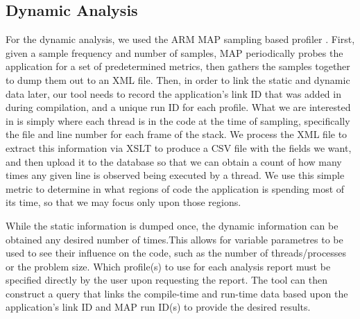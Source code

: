 \subsection{Dynamic Analysis}
\label{sec:dynamic}
For the dynamic analysis, we used the ARM MAP sampling based profiler \cite{arm-docs}.
First, given a sample frequency and number of samples, MAP periodically probes the application for 
a set of predetermined metrics, then gathers the samples together to dump them out to an \acs{XML} 
file. Then, in order to link the static and dynamic data later, our tool needs to record the application's 
link ID that was added in during compilation, and a unique run ID for each profile.
What we are interested in is simply where each thread is in the code at the time of sampling, 
specifically the file and line number for each frame of the stack.
We process the \acs{XML} file to extract this information via \ac{XSLT} to produce a \acs{CSV} file 
with the fields we want, and then upload it to the database so that we can obtain a count of how 
many 
times any given line is observed being executed by a thread.
We use this simple metric to determine in what regions of code the application is spending most of 
its time, so that we may focus only upon those regions.

While the static information is dumped once, the dynamic information can be obtained any desired 
number of times.This allows for variable parametres to be used to see their influence on the code, 
such as the number of threads/processes or the problem size. Which profile(s) to use for each 
analysis report must be specified directly by the user upon requesting the report.
The tool can then construct a query that links the compile-time and run-time data based upon the 
application's link ID and MAP run ID(s) to provide the desired results.
